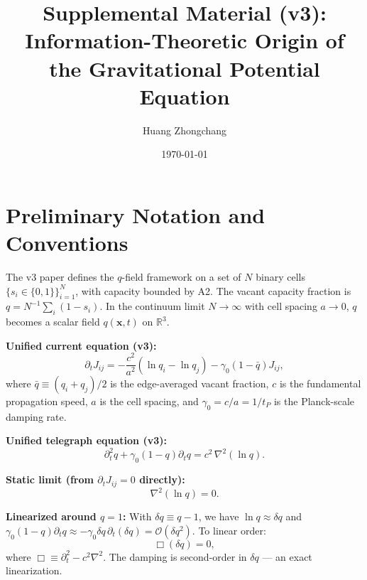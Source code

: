 \documentclass[reprint]{revtex4-2}
\begin{document}
\title{Supplemental Material (v3):\\
Information-Theoretic Origin of the Gravitational Potential Equation}

\author{Huang Zhongchang}

\date{\today}

\maketitle
\tableofcontents

\section{Preliminary Notation and Conventions}

The v3 paper defines the $q$-field framework on a set of $N$ binary cells $\{s_i\in\{0,1\}\}_{i=1}^N$, with capacity bounded by A2. The vacant capacity fraction is $q=N^{-1}\sum_i(1-s_i)$. In the continuum limit $N\to\infty$ with cell spacing $a\to0$, $q$ becomes a scalar field $q(\mathbf{x},t)$ on $\mathbb{R}^3$.

\textbf{Unified current equation (v3):}
\begin{equation}
\partial_t J_{ij} = -\frac{c^2}{a^2}(\ln q_i - \ln q_j) - \gamma_0(1-\bar{q})J_{ij},
\label{eq:unified_current}
\end{equation}
where $\bar{q} \equiv (q_i+q_j)/2$ is the edge-averaged vacant fraction, $c$ is the fundamental propagation speed, $a$ is the cell spacing, and $\gamma_0 = c/a = 1/t_P$ is the Planck-scale damping rate.

\textbf{Unified telegraph equation (v3):}
\begin{equation}
\boxed{\partial_t^2 q + \gamma_0(1-q)\partial_t q = c^2\,\nabla^2(\ln q)}.
\label{eq:unified_telegraph}
\end{equation}

\textbf{Static limit (from $\partial_t J_{ij}=0$ directly):}
\begin{equation}
\boxed{\nabla^2(\ln q) = 0}.
\label{eq:static_limit}
\end{equation}

\textbf{Linearized around $q=1$:} With $\delta q \equiv q-1$, we have $\ln q \approx \delta q$ and $\gamma_0(1-q)\partial_t q \approx -\gamma_0\delta q\,\partial_t(\delta q) = \mathcal{O}(\delta q^2)$. To linear order:
\begin{equation}
\boxed{\Box(\delta q) = 0},
\label{eq:linearized_exact}
\end{equation}
where $\Box \equiv \partial_t^2 - c^2\nabla^2$. The damping is second-order in $\delta q$ --- an exact linearization.
\end{document}
